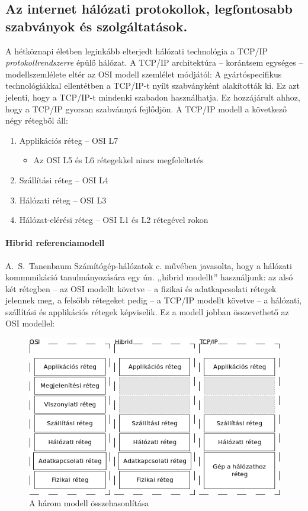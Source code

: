 \subsection{Az internet hálózati protokollok, legfontosabb szabványok és szolgáltatások.}
A hétköznapi életben leginkább elterjedt hálózati technológia a TCP/IP \emph{protokollrendszerre} épülő hálózat. A TCP/IP architektúra -- korántsem egységes -- modellszemlélete eltér az OSI modell szemlélet módjától:
A gyártóspecifikus technológiákkal ellentétben a TCP/IP-t nyílt szabványként alakították ki. Ez azt jelenti, hogy a TCP/IP-t mindenki szabadon használhatja. Ez hozzájárult ahhoz, hogy a TCP/IP gyorsan szabvánnyá fejlődjön.
A TCP/IP modell a következő négy rétegből áll:
\begin{enumerate}[nosep]
	\item Applikációs réteg -- OSI L7
	\begin{itemize}
		\item Az OSI L5 és L6 rétegekkel nincs megfeleltetés
	\end{itemize}
	\item Szállítási réteg -- OSI L4
	\item Hálózati réteg -- OSI L3
	\item Hálózat-elérési réteg -- OSI L1 és L2 rétegével rokon
\end{enumerate}
\paragraph{Hibrid referenciamodell}
A.~S.~Tanenbaum Számítógép-hálózatok c. művében javasolta, hogy a hálózati kommunikáció tanulmányozására egy ún. ,,hibrid modellt'' használjunk: az alsó két rétegben -- az OSI modellt követve -- a fizikai és adatkapcsolati rétegek jelennek meg, a felsőbb rétegeket pedig -- a TCP/IP modellt követve -- a hálózati, szállítási és applikációs rétegek képviselik. Ez a modell jobban összevethető az OSI modellel:
\begin{figure}[h]
	\centering
	\includegraphics[width=0.6\linewidth]{fig/7-Models}
	\caption{A három modell összehasonlítása}
	\label{fig:7-models}
\end{figure}

